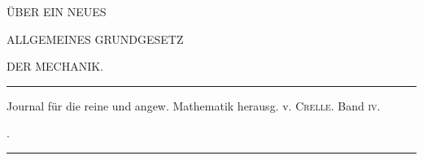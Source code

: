 \clearpage
\thispagestyle{empty}
\begin{center}
\vspace*{1.2in}
{\large ÜBER EIN NEUES\par}
\bigskip
{\Large ALLGEMEINES GRUNDGESETZ\par}
\bigskip
{\Large DER MECHANIK.\par}
\vfill
\rule{.8\textwidth}{.3pt}\par
\medskip
{\small Journal für die reine und angew. Mathematik herausg. v. \textsc{Crelle}. Band \textsc{iv}.\par}
.\par
\medskip
\rule{.8\textwidth}{.3pt}\par
\end{center}
\clearpage
